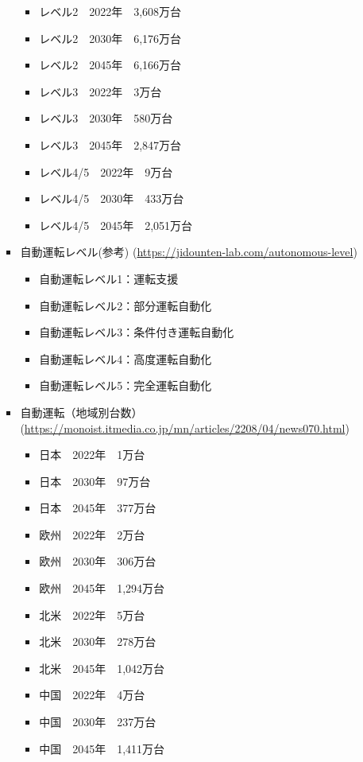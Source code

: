 \begin{itemize}
\begin{itemize}
\begin{itemize}
			\begin{itemize}
				\item レベル2　2022年　3,608万台
				\item レベル2　2030年　6,176万台
				\item レベル2　2045年　6,166万台
				\item レベル3　2022年　3万台
				\item レベル3　2030年　580万台
				\item レベル3　2045年　2,847万台
				\item レベル4/5　2022年　9万台
				\item レベル4/5　2030年　433万台
				\item レベル4/5　2045年　2,051万台
			\end{itemize}
			\item 自動運転レベル(参考) (\url{https://jidounten-lab.com/autonomous-level})
			\begin{itemize}
				\item 自動運転レベル1：運転支援
				\item 自動運転レベル2：部分運転自動化
				\item 自動運転レベル3：条件付き運転自動化
				\item 自動運転レベル4：高度運転自動化
				\item 自動運転レベル5：完全運転自動化
			\end{itemize}
			\item 自動運転（地域別台数） (\url{https://monoist.itmedia.co.jp/mn/articles/2208/04/news070.html})
			\begin{itemize}
				\item 日本　2022年　1万台
				\item 日本　2030年　97万台
				\item 日本　2045年　377万台
				\item 欧州　2022年　2万台
				\item 欧州　2030年　306万台
				\item 欧州　2045年　1,294万台
				\item 北米　2022年　5万台
				\item 北米　2030年　278万台
				\item 北米　2045年　1,042万台
				\item 中国　2022年　4万台
				\item 中国　2030年　237万台
				\item 中国　2045年　1,411万台
			\end{itemize}
		\end{itemize}

\end{itemize}
\end{itemize}
